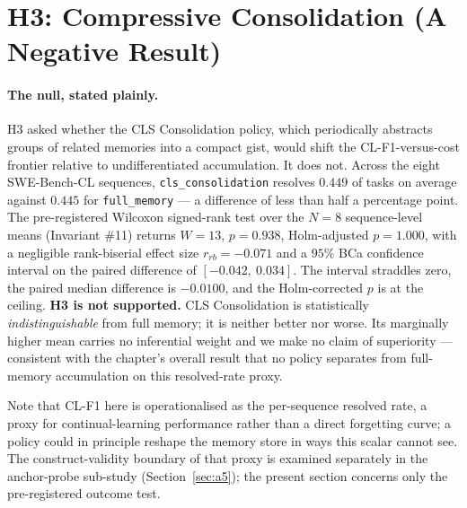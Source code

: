 

\section{H3: Compressive Consolidation (A Negative Result)}
\label{sec:h3}

\paragraph{The null, stated plainly.}
H3 asked whether the CLS Consolidation policy, which periodically abstracts groups of
related memories into a compact gist, would shift the CL-F1-versus-cost frontier relative
to undifferentiated accumulation. It does not. Across the eight SWE-Bench-CL sequences,
\texttt{cls\_consolidation} resolves $0.449$ of tasks on average against $0.445$ for
\texttt{full\_memory} --- a difference of less than half a percentage point. The
pre-registered Wilcoxon signed-rank test over the $N=8$ sequence-level means (Invariant
\#11) returns $W = 13$, $p = 0.938$, Holm-adjusted $p = 1.000$, with a negligible
rank-biserial effect size $r_{rb} = -0.071$ and a $95\%$ BCa confidence interval on the
paired difference of $[-0.042,\ 0.034]$. The interval straddles zero, the paired median
difference is $-0.0100$, and the Holm-corrected $p$ is at the ceiling. \textbf{H3 is not
supported.} CLS Consolidation is statistically \emph{indistinguishable} from full memory;
it is neither better nor worse. Its marginally higher mean carries no inferential weight
and we make no claim of superiority --- consistent with the chapter's overall result that
no policy separates from full-memory accumulation on this resolved-rate proxy.

Note that CL-F1 here is operationalised as the per-sequence resolved rate, a proxy for
continual-learning performance rather than a direct forgetting curve; a policy could in
principle reshape the memory store in ways this scalar cannot see. The construct-validity
boundary of that proxy is examined separately in the anchor-probe sub-study
(Section~\ref{sec:a5}); the present section concerns only the pre-registered outcome test.

